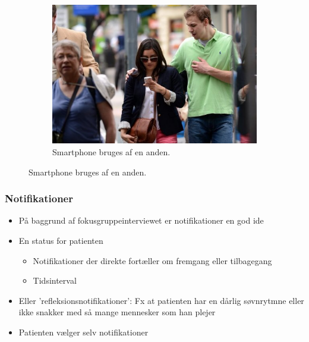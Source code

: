\begin{frame}
\begin{figure}
\begin{minipage}{\textwidth}
			~ %
			\begin{subfigure}[b]{0.3\textwidth}
				\includegraphics[width=\textwidth]{graphics/smartphone_other_user}
				\caption{Smartphone bruges af en anden.}
				\label{context:other_user}
				\end{subfigure}
\end{minipage}
\label{context}

\end{figure}
\end{frame}

\begin{frame}
\frametitle{Notifikationer}
\begin{itemize}
\item På baggrund af fokusgruppeinterviewet er notifikationer en god ide
\item En status for patienten
\begin{itemize}
\item Notifikationer der direkte fortæller om fremgang eller tilbagegang
\item Tidsinterval	
\end{itemize}

\item Eller 'refleksionsnotifikationer': Fx at patienten har en dårlig søvnrytmne eller ikke snakker med så mange mennesker som han plejer	
\item Patienten vælger selv notifikationer
\end{itemize}
\end{frame}

